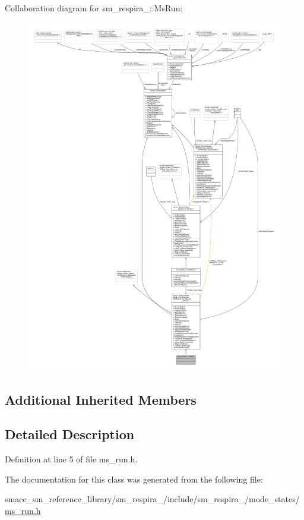 Collaboration diagram for sm\+\_\+respira\+\_\+:\+:Ms\+Run\+:
\nopagebreak
\begin{figure}[H]
\begin{center}
\leavevmode
\includegraphics[width=350pt]{classsm__respira__1_1_1MsRun__coll__graph}
\end{center}
\end{figure}
\subsection*{Additional Inherited Members}


\subsection{Detailed Description}


Definition at line 5 of file ms\+\_\+run.\+h.



The documentation for this class was generated from the following file\+:\begin{DoxyCompactItemize}
\item 
smacc\+\_\+sm\+\_\+reference\+\_\+library/sm\+\_\+respira\+\_/include/sm\+\_\+respira\+\_/mode\+\_\+states/\hyperlink{sm__respira__1_2include_2sm__respira__1_2mode__states_2ms__run_8h}{ms\+\_\+run.\+h}\end{DoxyCompactItemize}
